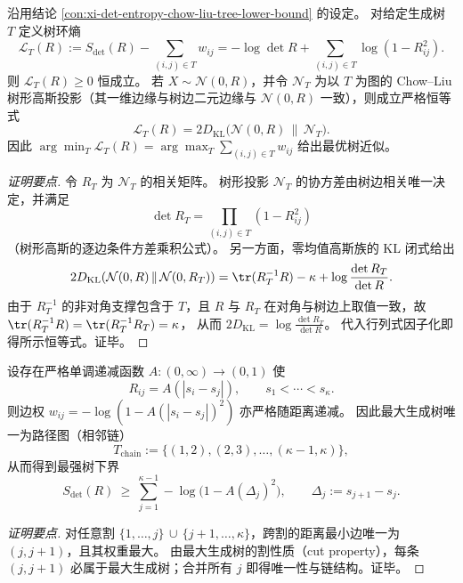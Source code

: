 \begin{conclusion}\label{con:xi-det-entropy-loop-entropy-kl-gap}
沿用结论 \ref{con:xi-det-entropy-chow-liu-tree-lower-bound} 的设定。
对给定生成树 \(T\) 定义树环熵
\[
\mathcal L_T(R):=S_{\det}(R)-\sum_{(i,j)\in T}w_{ij}
=-\log\det R+\sum_{(i,j)\in T}\log(1-R_{ij}^2).
\]
则 \(\mathcal L_T(R)\ge 0\) 恒成立。
若 \(X\sim\mathcal N(0,R)\)，并令 \(\mathcal N_T\) 为以 \(T\) 为图的 Chow--Liu 树形高斯投影（其一维边缘与树边二元边缘与 \(\mathcal N(0,R)\) 一致），则成立严格恒等式
\[
\mathcal L_T(R)=2D_{\mathrm{KL}}\!\bigl(\mathcal N(0,R)\,\|\,\mathcal N_T\bigr).
\]
因此
\(
\arg\min_T\mathcal L_T(R)=\arg\max_T\sum_{(i,j)\in T}w_{ij}
\)
给出最优树近似。
\end{conclusion}
\begin{proof}[证明要点]
令 \(R_T\) 为 \(\mathcal N_T\) 的相关矩阵。
树形投影 \(\mathcal N_T\) 的协方差由树边相关唯一决定，并满足
\[
\det R_T=\prod_{(i,j)\in T}(1-R_{ij}^2)
\]
（树形高斯的逐边条件方差乘积公式）。
另一方面，零均值高斯族的 KL 闭式给出
\[
2D_{\mathrm{KL}}(\mathcal N(0,R)\,\|\,\mathcal N(0,R_T))
=\tr(R_T^{-1}R)-\kappa+\log\frac{\det R_T}{\det R}.
\]
由于 \(R_T^{-1}\) 的非对角支撑包含于 \(T\)，且 \(R\) 与 \(R_T\) 在对角与树边上取值一致，故
\(
\tr(R_T^{-1}R)=\tr(R_T^{-1}R_T)=\kappa
\)，
从而
\(
2D_{\mathrm{KL}}=\log\frac{\det R_T}{\det R}
\)。
代入行列式因子化即得所示恒等式。证毕。
\end{proof}

\begin{conclusion}\label{con:xi-det-entropy-monotone-kernel-chain-mst}
设存在严格单调递减函数 \(A:(0,\infty)\to(0,1)\) 使
\[
R_{ij}=A(|s_i-s_j|),
\qquad
s_1<\cdots<s_\kappa.
\]
则边权 \(w_{ij}=-\log(1-A(|s_i-s_j|)^2)\) 亦严格随距离递减。
因此最大生成树唯一为路径图（相邻链）
\[
T_{\mathrm{chain}}:=\{(1,2),(2,3),\dots,(\kappa-1,\kappa)\},
\]
从而得到最强树下界
\[
S_{\det}(R)\ \ge\ \sum_{j=1}^{\kappa-1}-\log\!\bigl(1-A(\Delta_j)^2\bigr),
\qquad
\Delta_j:=s_{j+1}-s_j.
\]
\end{conclusion}
\begin{proof}[证明要点]
对任意割 \(\{1,\dots,j\}\,\cup\,\{j+1,\dots,\kappa\}\)，跨割的距离最小边唯一为 \((j,j+1)\)，且其权重最大。
由最大生成树的割性质（cut property），每条 \((j,j+1)\) 必属于最大生成树；合并所有 \(j\) 即得唯一性与链结构。证毕。
\end{proof}

